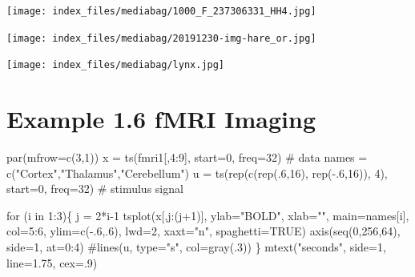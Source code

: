 \documentclass[
  letterpaper,
  DIV=11,
  numbers=noendperiod]{scrreprt}
\newenvironment{Shaded}{\begin{snugshade}}{\end{snugshade}}
\newcommand{\AttributeTok}[1]{\textcolor[rgb]{0.40,0.45,0.13}{#1}}
\newcommand{\CommentTok}[1]{\textcolor[rgb]{0.37,0.37,0.37}{#1}}
\newcommand{\ConstantTok}[1]{\textcolor[rgb]{0.56,0.35,0.01}{#1}}
\newcommand{\ControlFlowTok}[1]{\textcolor[rgb]{0.00,0.23,0.31}{#1}}
\newcommand{\DecValTok}[1]{\textcolor[rgb]{0.68,0.00,0.00}{#1}}
\newcommand{\FloatTok}[1]{\textcolor[rgb]{0.68,0.00,0.00}{#1}}
\newcommand{\FunctionTok}[1]{\textcolor[rgb]{0.28,0.35,0.67}{#1}}
\newcommand{\NormalTok}[1]{\textcolor[rgb]{0.00,0.23,0.31}{#1}}
\newcommand{\OtherTok}[1]{\textcolor[rgb]{0.00,0.23,0.31}{#1}}
\newcommand{\SpecialCharTok}[1]{\textcolor[rgb]{0.37,0.37,0.37}{#1}}
\newcommand{\StringTok}[1]{\textcolor[rgb]{0.13,0.47,0.30}{#1}}
\begin{document}
\texttt{[image: index\_files/mediabag/1000\_F\_237306331\_HH4.jpg]}

\texttt{[image: index\_files/mediabag/20191230-img-hare\_or.jpg]}

\texttt{[image: index\_files/mediabag/lynx.jpg]}

\section{Example 1.6 fMRI Imaging}\label{example-1.6-fmri-imaging}

\begin{Shaded}
\begin{Highlighting}[]
\FunctionTok{par}\NormalTok{(}\AttributeTok{mfrow=}\FunctionTok{c}\NormalTok{(}\DecValTok{3}\NormalTok{,}\DecValTok{1}\NormalTok{))}
\NormalTok{x }\OtherTok{=} \FunctionTok{ts}\NormalTok{(fmri1[,}\DecValTok{4}\SpecialCharTok{:}\DecValTok{9}\NormalTok{], }\AttributeTok{start=}\DecValTok{0}\NormalTok{, }\AttributeTok{freq=}\DecValTok{32}\NormalTok{)        }\CommentTok{\# data}
\NormalTok{names }\OtherTok{=} \FunctionTok{c}\NormalTok{(}\StringTok{"Cortex"}\NormalTok{,}\StringTok{"Thalamus"}\NormalTok{,}\StringTok{"Cerebellum"}\NormalTok{)}
\NormalTok{u }\OtherTok{=} \FunctionTok{ts}\NormalTok{(}\FunctionTok{rep}\NormalTok{(}\FunctionTok{c}\NormalTok{(}\FunctionTok{rep}\NormalTok{(.}\DecValTok{6}\NormalTok{,}\DecValTok{16}\NormalTok{), }\FunctionTok{rep}\NormalTok{(}\SpecialCharTok{{-}}\NormalTok{.}\DecValTok{6}\NormalTok{,}\DecValTok{16}\NormalTok{)), }\DecValTok{4}\NormalTok{), }\AttributeTok{start=}\DecValTok{0}\NormalTok{, }\AttributeTok{freq=}\DecValTok{32}\NormalTok{) }\CommentTok{\# stimulus signal}

\ControlFlowTok{for}\NormalTok{ (i }\ControlFlowTok{in} \DecValTok{1}\SpecialCharTok{:}\DecValTok{3}\NormalTok{)\{ }
\NormalTok{ j }\OtherTok{=} \DecValTok{2}\SpecialCharTok{*}\NormalTok{i}\DecValTok{{-}1}
 \FunctionTok{tsplot}\NormalTok{(x[,j}\SpecialCharTok{:}\NormalTok{(j}\SpecialCharTok{+}\DecValTok{1}\NormalTok{)], }\AttributeTok{ylab=}\StringTok{"BOLD"}\NormalTok{, }\AttributeTok{xlab=}\StringTok{""}\NormalTok{, }\AttributeTok{main=}\NormalTok{names[i], }\AttributeTok{col=}\DecValTok{5}\SpecialCharTok{:}\DecValTok{6}\NormalTok{, }\AttributeTok{ylim=}\FunctionTok{c}\NormalTok{(}\SpecialCharTok{{-}}\NormalTok{.}\DecValTok{6}\NormalTok{,.}\DecValTok{6}\NormalTok{), }
        \AttributeTok{lwd=}\DecValTok{2}\NormalTok{, }\AttributeTok{xaxt=}\StringTok{"n"}\NormalTok{, }\AttributeTok{spaghetti=}\ConstantTok{TRUE}\NormalTok{)}
 \FunctionTok{axis}\NormalTok{(}\FunctionTok{seq}\NormalTok{(}\DecValTok{0}\NormalTok{,}\DecValTok{256}\NormalTok{,}\DecValTok{64}\NormalTok{), }\AttributeTok{side=}\DecValTok{1}\NormalTok{, }\AttributeTok{at=}\DecValTok{0}\SpecialCharTok{:}\DecValTok{4}\NormalTok{)}
 \CommentTok{\#lines(u, type="s", col=gray(.3)) }
\NormalTok{\}}
\FunctionTok{mtext}\NormalTok{(}\StringTok{"seconds"}\NormalTok{, }\AttributeTok{side=}\DecValTok{1}\NormalTok{, }\AttributeTok{line=}\FloatTok{1.75}\NormalTok{, }\AttributeTok{cex=}\NormalTok{.}\DecValTok{9}\NormalTok{)}
\end{Highlighting}
\end{Shaded}
\end{document}

